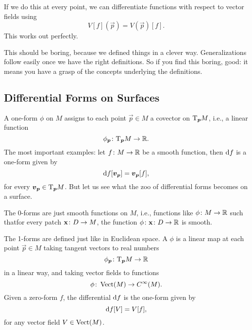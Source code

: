 If we do this at every point, we can differentiate functions with
respect to vector fields using
\begin{equation}
V[f](\vec{p}) = V(\vec{p})[f].
\end{equation}
This works out perfectly.

\begin{remark}[Boring]
This should be boring, because we defined things in a clever way.
Generalizations follow easily once we have the right definitions.
So if you find this boring, good: it means you have a grasp of the
concepts underlying the definitions.
\end{remark}
\vfill\eject

\subsection{Differential Forms on Surfaces}

\M A one-form $\phi$ on $M$ assigns to each point $\vec{p}\in M$ a
covector on $\mathrm{T}_{\boldsymbol{p}}M$, i.e., a linear function
\begin{equation}
\phi_{\boldsymbol{p}}\colon \mathrm{T}_{\boldsymbol{p}}M\to\mathbb{R}.
\end{equation}
The most important examples: let $f\colon M\to\mathbb{R}$ be a smooth function,
then $\mathrm{d} f$ is a one-form given by
\begin{equation}
\mathrm{d} f[\boldsymbol{v}_{\boldsymbol{p}}] = \boldsymbol{v}_{\boldsymbol{p}}[f],
\end{equation}
for every $\boldsymbol{v}_{\boldsymbol{p}}\in\mathrm{T}_{\boldsymbol{p}}M$.
But let us see what the zoo of differential forms becomes on a surface.

The 0-forms are just smooth functions on $M$, i.e.,
functions like $\phi\colon M\to\mathbb{R}$ such thatfor every patch
$\mathbf{x}\colon D\to M$, the function $\phi\colon\mathbf{x}\colon D\to\mathbb{R}$
is smooth.

The 1-forms are defined just like in Euclidean space. A
 $\phi$ is a linear map at each point $\vec{p}\in M$
taking tangent vectors to real numbers
\begin{equation}
\phi_{\boldsymbol{p}}\colon\mathrm{T}_{\boldsymbol{p}}M\to\mathbb{R}
\end{equation}
in a linear way, and taking vector fields to functions
\begin{equation}
\phi\colon\operatorname{Vect}(M)\to C^{\infty}(M).
\end{equation}
Given a zero-form $f$, the differential $\mathrm{d} f$ is the one-form given by
\begin{equation}
\mathrm{d} f[V] = V[f],
\end{equation}
for any vector field $V\in\operatorname{Vect}(M)$.

